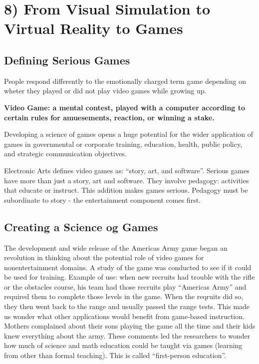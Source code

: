 \chapter*{8) From Visual Simulation to Virtual Reality to Games}

    \section*{Defining Serious Games}
    People respond differently to the emotionally charged term game depending on wheter they played or did not play video games while growing up. 

    {\bf Video Game: a mental contest, played with a computer according to certain rules for amuesements, reaction, or winning a stake.}

    Developing a science of games opens a huge potential for the wider application of games in governmental or corporate training, education, health, public policy, and strategic  communication objectives. 

    Electronic Arts defines video games as: ``story, art, and software''. 
    Serious games have more than just a story, art and software. They involve pedagogy: activities that educate or instruct. This addition makes games serious. Pedagogy must be subordinate to story - the entertainment component comes first. 

    \section*{Creating a Science og Games}
    The development and wide release of the Americas Army game began an revolution in thinking about the potential role of video games for nonentertainment domains. A study of the game was conducted to see if  it could be used for training. 
    Example of use: when new recruits had trouble with the rifle or the obstacles course, his team had those recruits play ``Americas Army'' and required them to complete those levels in the game. When the reqruits did so, they then went back to the range and usually passed the range tests. This made us wonder what other applications would benefit from game-based instruction.
    Mothers complained about their sons playing the game all the time and their kids knew everything about the army. These comments led the researchers to wonder how much of science and math education could be taught via games (learning from other than formal teaching). This is called ``first-person education''. 

